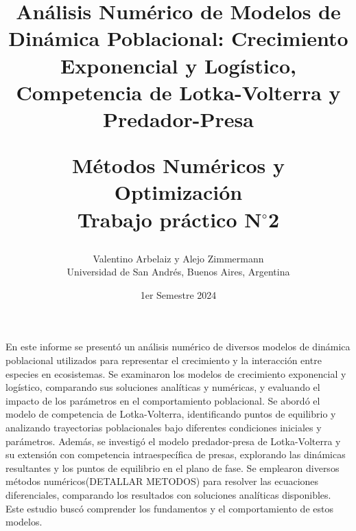 \documentclass[12pt,a4]{article} %
\title{Análisis Numérico de Modelos de Dinámica Poblacional: Crecimiento Exponencial y Logístico, Competencia de Lotka-Volterra y Predador-Presa\\


\vspace{20mm}

 Métodos Numéricos y Optimización\\
 Trabajo práctico N$^{\circ}$2\\
}
\author{Valentino Arbelaiz y Alejo Zimmermann\\ [2mm] %
\small Universidad de San Andrés, Buenos Aires, Argentina}
\date{1er Semestre 2024}
\begin{document}
\vspace{1cm} %



\maketitle


\begin{abstract}

\vspace{2mm}
\end{abstract}

 En este informe se presentó un análisis numérico de diversos modelos de dinámica poblacional utilizados para representar el crecimiento y la interacción entre especies en ecosistemas. Se examinaron los modelos de crecimiento exponencial y logístico, comparando sus soluciones analíticas y numéricas, y evaluando el impacto de los parámetros en el comportamiento poblacional. Se abordó el modelo de competencia de Lotka-Volterra, identificando puntos de equilibrio y analizando trayectorias poblacionales bajo diferentes condiciones iniciales y parámetros. Además, se investigó el modelo predador-presa de Lotka-Volterra y su extensión con competencia intraespecífica de presas, explorando las dinámicas resultantes y los puntos de equilibrio en el plano de fase. Se emplearon diversos métodos numéricos(DETALLAR METODOS) para resolver las ecuaciones diferenciales, comparando los resultados con soluciones analíticas disponibles. Este estudio buscó comprender los fundamentos y el comportamiento de estos modelos.\\
\end{document}
